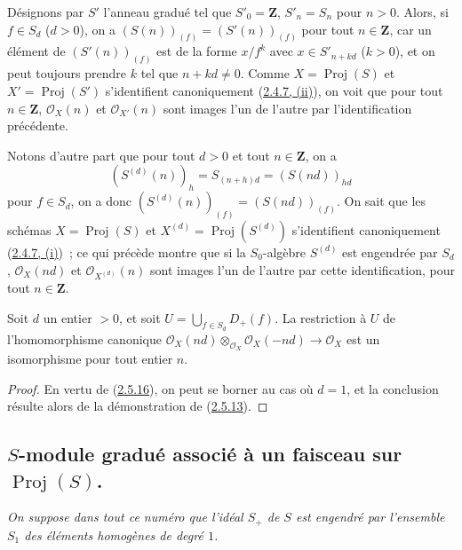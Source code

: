 \begin{env}[2.5.16]
\label{II.2.5.16-fr}
Désignons par $S'$ l'anneau gradué tel que $S'_0=\mathbf{Z}$,
$S'_n=S_n$ pour $n>0$. Alors, si $f\in S_d$ ($d>0$), on a
$(S(n))_{(f)}=(S'(n))_{(f)}$ pour tout $n\in\mathbf{Z}$, car un élément de
$(S'(n))_{(f)}$ est de la forme $x/f^k$ avec $x\in S'_{n+kd}$ ($k>0$), et
on peut toujours prendre $k$ tel que $n+kd\neq0$. Comme
$X=\operatorname{Proj}(S)$ et $X'=\operatorname{Proj}(S')$ s'identifient
canoniquement (\hyperref[II.2.4.7-fr]{2.4.7, (ii)}), on voit que pour tout
$n\in\mathbf{Z}$, $\mathcal{O}_X(n)$ et $\mathcal{O}_{X'}(n)$ sont images
l'un de l'autre par l'identification précédente.

Notons d'autre part que pour tout $d>0$ et tout $n\in\mathbf{Z}$, on a
\[
  (S^{(d)}(n))_h=S_{(n+h)d}=(S(nd))_{hd}
\]
pour $f\in S_d$, on a donc $(S^{(d)}(n))_{(f)}=(S(nd))_{(f)}$. On sait que
les schémas $X=\operatorname{Proj}(S)$ et
$X^{(d)}=\operatorname{Proj}(S^{(d)})$ s'identifient canoniquement
(\hyperref[II.2.4.7-fr]{2.4.7, (i)})~; ce qui précède montre que si la
$S_0$-algèbre $S^{(d)}$ est engendrée par $S_d$, $\mathcal{O}_X(nd)$ et
$\mathcal{O}_{X^{(d)}}(n)$ sont images l'un de l'autre par cette
identification, pour tout $n\in\mathbf{Z}$.
\end{env}

\begin{proposition}[2.5.17]
\label{II.2.5.17-fr}
Soit $d$ un entier $>0$, et soit
$U=\bigcup_{f\in S_d}D_+(f)$. La restriction à $U$ de l'homomorphisme
canonique
$\mathcal{O}_X(nd)\otimes_{\mathcal{O}_X}\mathcal{O}_X(-nd)
\to\mathcal{O}_X$ est un isomorphisme pour tout entier $n$.
\end{proposition}

\begin{proof}
En vertu de (\hyperref[II.2.5.16-fr]{2.5.16}), on peut se borner au cas où
$d=1$, et la conclusion résulte alors de la démonstration de
(\hyperref[II.2.5.13-fr]{2.5.13}).
\end{proof}

\subsection{$S$-module gradué associé à un faisceau sur
$\operatorname{Proj}(S)$.}
\label{subsection:II.2.6-fr}

\emph{On suppose dans tout ce numéro que l'idéal $S_+$ de $S$ est engendré
par l'ensemble $S_1$ des éléments homogènes de degré $1$.}

